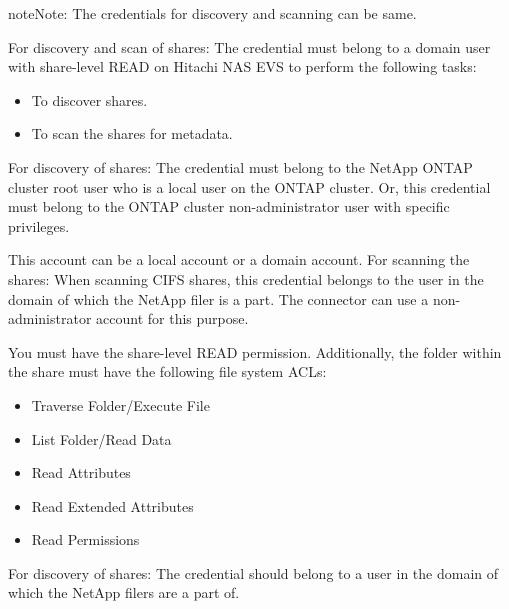 \documentclass[letterpaper,10pt,english]{sphinxmanual}
\begin{document}

\begin{sphinxadmonition}{note}{Note:}
The credentials for discovery and scanning can be same.
\end{sphinxadmonition}

For discovery and scan of shares: The credential must belong to a domain user with share-level READ on Hitachi NAS EVS to perform the following tasks:
\begin{itemize}
\item {} 
To discover shares.

\item {} 
To scan the shares for metadata.

\end{itemize}


For discovery of shares: The credential must belong to the NetApp ONTAP cluster root user who is a local user on the ONTAP cluster. Or, this credential must belong to the ONTAP cluster non-administrator user with specific privileges.

This account can be a local account or a domain account. For scanning the shares: When scanning CIFS shares, this credential belongs to the user in the domain of which the NetApp filer is a part. The connector can use a non-administrator account for this purpose.

You must have the share-level READ permission. Additionally, the folder within the share must have the following file system ACLs:
\begin{itemize}
\item {} 
Traverse Folder/Execute File

\item {} 
List Folder/Read Data

\item {} 
Read Attributes

\item {} 
Read Extended Attributes

\item {} 
Read Permissions

\end{itemize}


For discovery of shares: The credential should belong to a user in the domain of which the NetApp filers are a part of.
\end{document}
